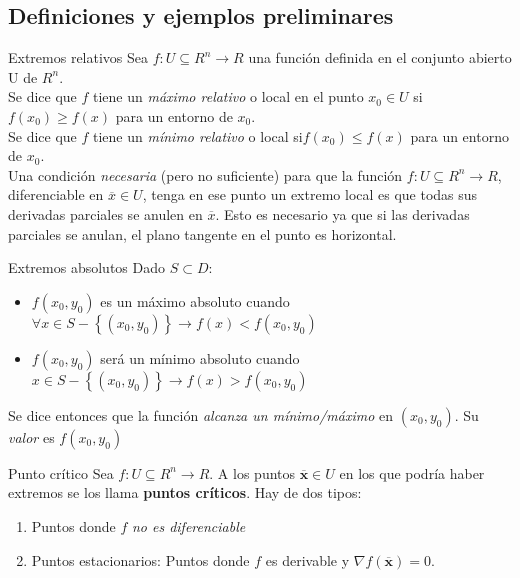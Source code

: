\documentclass[a4paper, twoside]{article}
\numberwithin{equation}{section}
\numberwithin{figure}{section}
\numberwithin{table}{section}
\newcommand{\vect}[1]{\overline{\textbf{#1}}}
\begin{document}
\subsection{Definiciones y ejemplos preliminares}
\begin{definicion*}{Extremos relativos}
	Sea $f:U\subseteq R^n \to R$ una función definida en el conjunto abierto U de $R^n$.\\
	
	Se dice que $f$ tiene un \emph{máximo relativo} o local en el punto $x_0\in U$ si $f(x_0)\ge f(x)$ para un entorno de $x_0$.\\
	
	Se dice que $f$ tiene un \emph{mínimo relativo} o local si$f(x_0)\le f(x)$ para un entorno de $x_0$.\\
	
	Una condición \textit{necesaria} (pero no suficiente) para que la función $f:U\subseteq R^n \to R$, diferenciable en $\overline{x}\in U$, tenga en ese punto un extremo local es que todas sus derivadas parciales se anulen en $\overline{x}$. Esto es necesario ya que si las derivadas parciales se anulan, el plano tangente en el punto es horizontal.
\end{definicion*}

\begin{definicion*}{Extremos absolutos}
	Dado $S\subset D$:
	\begin{itemize}
		\item $f(x_0,y_0)$ es un máximo absoluto cuando $\forall x \in S-\left\{ (x_0,y_0)\right\} \to f(x) < f(x_0,y_0)$
		\item $f(x_0,y_0)$ será un mínimo absoluto cuando $x \in S-\left\{ (x_0,y_0) \right\} \to f(x) > f(x_0,y_0)$
	\end{itemize}
	Se dice entonces que la función \emph{alcanza un mínimo/máximo} en $(x_0,y_0)$. Su \emph{valor} es $f(x_0,y_0)$\\
\end{definicion*}

\begin{definicion*}{Punto crítico}
	Sea $f:U\subseteq R^n \to R$. A los puntos $\vect{x} \in U$ en los que podría haber extremos se los llama \textbf{puntos críticos}. Hay de dos tipos:
	\begin{enumerate}
		\item Puntos donde $f$ \emph{no es diferenciable}
		\item Puntos estacionarios: Puntos donde $f$ es derivable y $\nabla f(\vect{x})=0$.
	\end{enumerate}
\end{definicion*}
\end{document}
